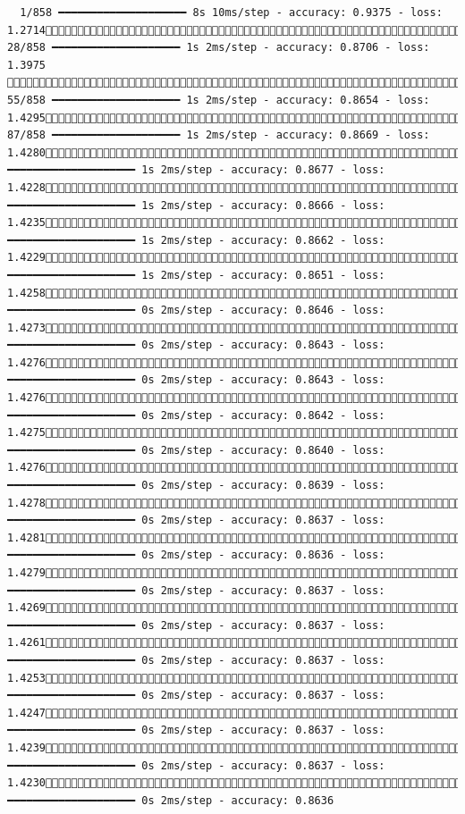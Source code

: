 \documentclass[
  letterpaper,
  DIV=11,
  numbers=noendperiod]{scrartcl}
\begin{document}
\begin{verbatim}
  1/858 ━━━━━━━━━━━━━━━━━━━━ 8s 10ms/step - accuracy: 0.9375 - loss: 1.2714 28/858 ━━━━━━━━━━━━━━━━━━━━ 1s 2ms/step - accuracy: 0.8706 - loss: 1.3975  55/858 ━━━━━━━━━━━━━━━━━━━━ 1s 2ms/step - accuracy: 0.8654 - loss: 1.4295 87/858 ━━━━━━━━━━━━━━━━━━━━ 1s 2ms/step - accuracy: 0.8669 - loss: 1.4280120/858 ━━━━━━━━━━━━━━━━━━━━ 1s 2ms/step - accuracy: 0.8677 - loss: 1.4228155/858 ━━━━━━━━━━━━━━━━━━━━ 1s 2ms/step - accuracy: 0.8666 - loss: 1.4235189/858 ━━━━━━━━━━━━━━━━━━━━ 1s 2ms/step - accuracy: 0.8662 - loss: 1.4229224/858 ━━━━━━━━━━━━━━━━━━━━ 1s 2ms/step - accuracy: 0.8651 - loss: 1.4258257/858 ━━━━━━━━━━━━━━━━━━━━ 0s 2ms/step - accuracy: 0.8646 - loss: 1.4273291/858 ━━━━━━━━━━━━━━━━━━━━ 0s 2ms/step - accuracy: 0.8643 - loss: 1.4276301/858 ━━━━━━━━━━━━━━━━━━━━ 0s 2ms/step - accuracy: 0.8643 - loss: 1.4276324/858 ━━━━━━━━━━━━━━━━━━━━ 0s 2ms/step - accuracy: 0.8642 - loss: 1.4275354/858 ━━━━━━━━━━━━━━━━━━━━ 0s 2ms/step - accuracy: 0.8640 - loss: 1.4276386/858 ━━━━━━━━━━━━━━━━━━━━ 0s 2ms/step - accuracy: 0.8639 - loss: 1.4278421/858 ━━━━━━━━━━━━━━━━━━━━ 0s 2ms/step - accuracy: 0.8637 - loss: 1.4281455/858 ━━━━━━━━━━━━━━━━━━━━ 0s 2ms/step - accuracy: 0.8636 - loss: 1.4279491/858 ━━━━━━━━━━━━━━━━━━━━ 0s 2ms/step - accuracy: 0.8637 - loss: 1.4269525/858 ━━━━━━━━━━━━━━━━━━━━ 0s 2ms/step - accuracy: 0.8637 - loss: 1.4261563/858 ━━━━━━━━━━━━━━━━━━━━ 0s 2ms/step - accuracy: 0.8637 - loss: 1.4253596/858 ━━━━━━━━━━━━━━━━━━━━ 0s 2ms/step - accuracy: 0.8637 - loss: 1.4247631/858 ━━━━━━━━━━━━━━━━━━━━ 0s 2ms/step - accuracy: 0.8637 - loss: 1.4239667/858 ━━━━━━━━━━━━━━━━━━━━ 0s 2ms/step - accuracy: 0.8637 - loss: 1.4230700/858 ━━━━━━━━━━━━━━━━━━━━ 0s 2ms/step - accuracy: 0.8636 
\end{verbatim}
\end{document}
